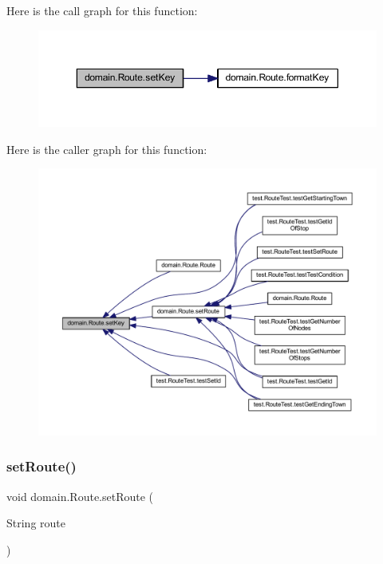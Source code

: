 Here is the call graph for this function\+:\nopagebreak
\begin{figure}[H]
\begin{center}
\leavevmode
\includegraphics[width=350pt]{classdomain_1_1_route_a3b472fbb44362997723edf02014bc77f_cgraph}
\end{center}
\end{figure}
Here is the caller graph for this function\+:\nopagebreak
\begin{figure}[H]
\begin{center}
\leavevmode
\includegraphics[width=350pt]{classdomain_1_1_route_a3b472fbb44362997723edf02014bc77f_icgraph}
\end{center}
\end{figure}
\mbox{\label{classdomain_1_1_route_ac152ebbec9a46aee30cdd98c3a35a6d5}} 
\subsubsection{\texorpdfstring{set\+Route()}{setRoute()}}
{\footnotesize\ttfamily void domain.\+Route.\+set\+Route (\begin{DoxyParamCaption}\item[{String}]{route }\end{DoxyParamCaption})}


